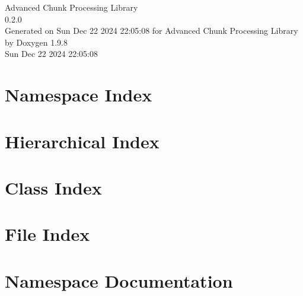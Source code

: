\documentclass[twoside]{book}
\newcommand{\+}{\discretionary{\mbox{\scriptsize$\hookleftarrow$}}{}{}}
\newcommand{\clearemptydoublepage}{%
    \newpage{\pagestyle{empty}\cleardoublepage}%
  }
\begin{document}
  \raggedbottom
    \hypersetup{pageanchor=false,
                bookmarksnumbered=true,
                pdfencoding=unicode
               }
  \begin{titlepage}
  \vspace*{7cm}
  \begin{center}%
  {\Large Advanced Chunk Processing Library}\\
  [1ex]\large 0.\+2.\+0 \\
  \vspace*{1cm}
  {\large Generated on Sun Dec 22 2024 22\+:05\+:08 for Advanced Chunk Processing Library by Doxygen 1.9.8}\\
    \vspace*{0.5cm}
    {\small Sun Dec 22 2024 22:05:08}
  \end{center}
  \end{titlepage}
  \clearemptydoublepage
  \tableofcontents
  \clearemptydoublepage
  \hypersetup{pageanchor=true}

\chapter{Namespace Index}

\chapter{Hierarchical Index}

\chapter{Class Index}

\chapter{File Index}

\chapter{Namespace Documentation}







\end{document}
